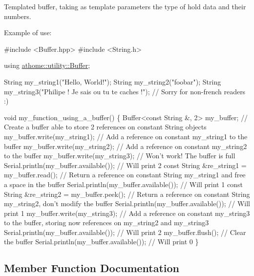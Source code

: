 Templated buffer, taking as template parameters the type of hold data and their numbers.

Example of use\+:


\begin{DoxyCode}
\textcolor{preprocessor}{#include <Buffer.hpp>}
\textcolor{preprocessor}{#include <String.h>}

\textcolor{keyword}{using} \mbox{\hyperlink{classathome_1_1utility_1_1_buffer}{athome::utility::Buffer}};

String my\_string1(\textcolor{stringliteral}{"Hello, World!"});
String my\_string2(\textcolor{stringliteral}{"foobar"});
String my\_string3(\textcolor{stringliteral}{"Philipe ! Je sais ou tu te caches !"}); \textcolor{comment}{// Sorry for non-french readers :)}

\textcolor{keywordtype}{void} my\_function\_using\_a\_buffer() \{
  Buffer<const String &, 2> my\_buffer; \textcolor{comment}{// Create a buffer able to store 2 references on constant String
       objects}
  my\_buffer.write(my\_string1); \textcolor{comment}{// Add a reference on constant my\_string1 to the buffer}
  my\_buffer.write(my\_string2); \textcolor{comment}{// Add a reference on constant my\_string2 to the buffer}
  my\_buffer.write(my\_string3); \textcolor{comment}{// Won't work! The buffer is full}
  Serial.println(my\_buffer.available()); \textcolor{comment}{// Will print 2}
  \textcolor{keyword}{const} String &re\_string1 = my\_buffer.read(); \textcolor{comment}{// Return a reference on constant String my\_string1 and free
       a space in the buffer}
  Serial.println(my\_buffer.available()); \textcolor{comment}{// Will print 1}
  \textcolor{keyword}{const} String &re\_string2 = my\_buffer.peek(); \textcolor{comment}{// Return a reference on constant String my\_string2, don't
       modify the buffer}
  Serial.println(my\_buffer.available()); \textcolor{comment}{// Will print 1}
  my\_buffer.write(my\_string3); \textcolor{comment}{// Add a reference on constant my\_string3 to the buffer, storing now
       references on my\_string2 and my\_string3}
  Serial.println(my\_buffer.available()); \textcolor{comment}{// Will print 2}
  my\_buffer.flush(); \textcolor{comment}{// Clear the buffer}
  Serial.println(my\_buffer.available()); \textcolor{comment}{// Will print 0}
\}
\end{DoxyCode}
 

\subsection{Member Function Documentation}
\mbox{\label{classathome_1_1utility_1_1_buffer_a2c441e74e8e325e8eb6cfb7ffb04b157}} 
